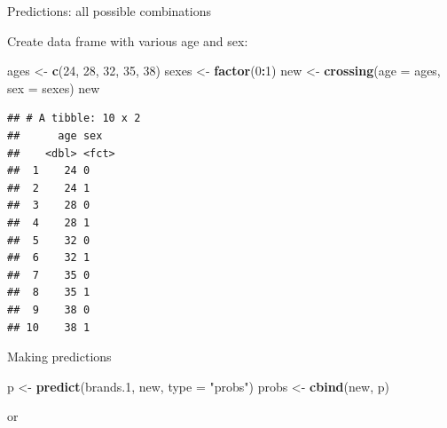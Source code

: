 \documentclass[
  ignorenonframetext,
]{beamer}
\newenvironment{Shaded}{\begin{snugshade}}{\end{snugshade}}
\newcommand{\DataTypeTok}[1]{\textcolor[rgb]{0.13,0.29,0.53}{#1}}
\newcommand{\DecValTok}[1]{\textcolor[rgb]{0.00,0.00,0.81}{#1}}
\newcommand{\FloatTok}[1]{\textcolor[rgb]{0.00,0.00,0.81}{#1}}
\newcommand{\KeywordTok}[1]{\textcolor[rgb]{0.13,0.29,0.53}{\textbf{#1}}}
\newcommand{\NormalTok}[1]{#1}
\newcommand{\OperatorTok}[1]{\textcolor[rgb]{0.81,0.36,0.00}{\textbf{#1}}}
\newcommand{\StringTok}[1]{\textcolor[rgb]{0.31,0.60,0.02}{#1}}
\begin{document}
\begin{frame}[fragile]{Predictions: all possible combinations}
\protect\hypertarget{predictions-all-possible-combinations}{}

Create data frame with various age and sex:

\footnotesize

\begin{Shaded}
\begin{Highlighting}[]
\NormalTok{ages <-}\StringTok{ }\KeywordTok{c}\NormalTok{(}\DecValTok{24}\NormalTok{, }\DecValTok{28}\NormalTok{, }\DecValTok{32}\NormalTok{, }\DecValTok{35}\NormalTok{, }\DecValTok{38}\NormalTok{)}
\NormalTok{sexes <-}\StringTok{ }\KeywordTok{factor}\NormalTok{(}\DecValTok{0}\OperatorTok{:}\DecValTok{1}\NormalTok{)}
\NormalTok{new <-}\StringTok{ }\KeywordTok{crossing}\NormalTok{(}\DataTypeTok{age =}\NormalTok{ ages, }\DataTypeTok{sex =}\NormalTok{ sexes)}
\NormalTok{new}
\end{Highlighting}
\end{Shaded}

\begin{verbatim}
## # A tibble: 10 x 2
##      age sex  
##    <dbl> <fct>
##  1    24 0    
##  2    24 1    
##  3    28 0    
##  4    28 1    
##  5    32 0    
##  6    32 1    
##  7    35 0    
##  8    35 1    
##  9    38 0    
## 10    38 1
\end{verbatim}

\normalsize

\end{frame}

\begin{frame}[fragile]{Making predictions}
\protect\hypertarget{making-predictions}{}

\begin{Shaded}
\begin{Highlighting}[]
\NormalTok{p <-}\StringTok{ }\KeywordTok{predict}\NormalTok{(brands}\FloatTok{.1}\NormalTok{, new, }\DataTypeTok{type =} \StringTok{"probs"}\NormalTok{)}
\NormalTok{probs <-}\StringTok{ }\KeywordTok{cbind}\NormalTok{(new, p)}
\end{Highlighting}
\end{Shaded}

or

\begin{Shaded}
\end{Shaded}

\end{frame}
\end{document}
